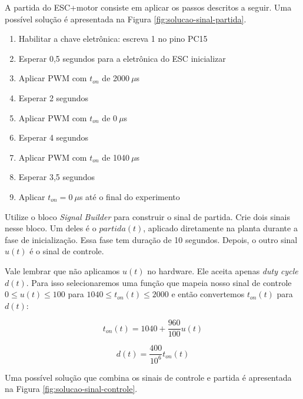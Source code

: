 \documentclass[a4paper,12pt]{exam}
\begin{document}
A partida do ESC+motor consiste em aplicar os passos descritos a seguir. Uma possível solução é apresentada na Figura \ref{fig:solucao-sinal-partida}.

\begin{enumerate}
    \item Habilitar a chave eletrônica: escreva 1 no pino PC15
    \item Esperar 0,5 segundos para a eletrônica do ESC inicializar
    \item Aplicar PWM com $t_{on}$ de 2000$~\mu$s
    \item Esperar 2 segundos
    \item Aplicar PWM com $t_{on}$ de 0$~\mu$s
    \item Esperar 4 segundos
    \item Aplicar PWM com $t_{on}$ de 1040$~\mu$s
    \item Esperar 3,5 segundos
    \item Aplicar $t_{on} = 0~\mu$s até o final do experimento
\end{enumerate} 


\hspace*{1mm}

Utilize o bloco \textit{Signal Builder} para construir o sinal de partida. Crie dois sinais nesse bloco. Um deles é o $partida(t)$, aplicado diretamente na planta durante a fase de inicialização. Essa fase tem duração de 10 segundos. Depois, o outro sinal $u(t)$ é o sinal de controle.

Vale lembrar que não aplicamos $u(t)$ no hardware. Ele aceita apenas \textit{duty cycle} $d(t)$. Para isso selecionaremos uma função que mapeia nosso sinal de controle $0 \leq u(t) \leq 100$ para $1040 \leq t_{on}(t) \leq 2000$ e então convertemos $t_{on}(t)$ para $d(t)$:

\begin{equation}
    t_{on}(t) = 1040 + \frac{960}{100} u(t)
\end{equation}

\begin{equation}
    d(t) = \frac{400}{10^6} t_{on}(t)
\end{equation}

Uma possível solução que combina os sinais de controle e partida é apresentada na Figura \ref{fig:solucao-sinal-controle}.
\end{document}
